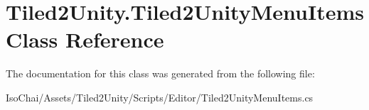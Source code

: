 \hypertarget{class_tiled2_unity_1_1_tiled2_unity_menu_items}{}\section{Tiled2\+Unity.\+Tiled2\+Unity\+Menu\+Items Class Reference}
\label{class_tiled2_unity_1_1_tiled2_unity_menu_items}


The documentation for this class was generated from the following file\+:\begin{DoxyCompactItemize}
\item 
Iso\+Chai/\+Assets/\+Tiled2\+Unity/\+Scripts/\+Editor/Tiled2\+Unity\+Menu\+Items.\+cs\end{DoxyCompactItemize}

